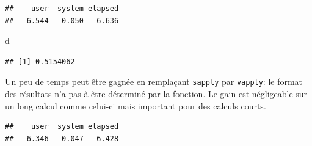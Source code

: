 \documentclass[
  12pt,
  french,
  a4paper,
  extrafontsizes,onecolumn,openright
  ]{memoir}
\newenvironment{Shaded}{\begin{snugshade}}{\end{snugshade}}
\newcommand{\ControlFlowTok}[1]{\textcolor[rgb]{0.13,0.29,0.53}{\textbf{#1}}}
\newcommand{\DecValTok}[1]{\textcolor[rgb]{0.00,0.00,0.81}{#1}}
\newcommand{\KeywordTok}[1]{\textcolor[rgb]{0.13,0.29,0.53}{\textbf{#1}}}
\newcommand{\NormalTok}[1]{#1}
\newcommand{\OperatorTok}[1]{\textcolor[rgb]{0.81,0.36,0.00}{\textbf{#1}}}
\newcommand{\StringTok}[1]{\textcolor[rgb]{0.31,0.60,0.02}{#1}}
\begin{document}
\begin{verbatim}
##    user  system elapsed 
##   6.544   0.050   6.636
\end{verbatim}

\begin{Shaded}
\begin{Highlighting}[]
\NormalTok{d}
\end{Highlighting}
\end{Shaded}

\begin{verbatim}
## [1] 0.5154062
\end{verbatim}

\normalsize

Un peu de temps peut être gagnée en remplaçant \texttt{sapply} par \texttt{vapply}: le format des résultats n'a pas à être déterminé par la fonction.
Le gain est négligeable sur un long calcul comme celui-ci mais important pour des calculs courts.

\scriptsize

\begin{Shaded}
\end{Shaded}

\begin{verbatim}
##    user  system elapsed 
##   6.346   0.047   6.428
\end{verbatim}
\end{document}
